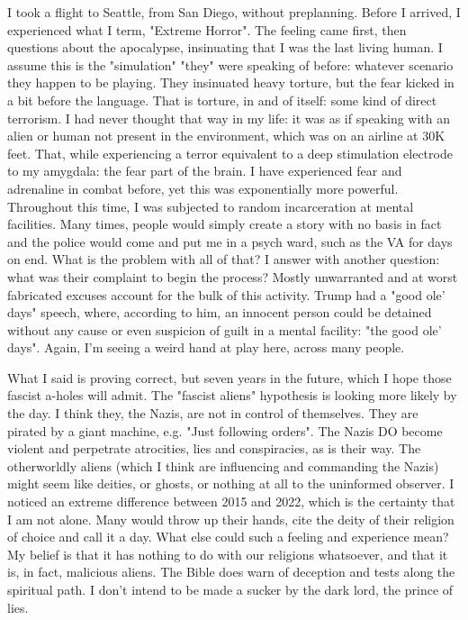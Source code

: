 \documentclass{article}
\begin{document}
\begin{multicols}{2}
I took a flight to Seattle, from San Diego, without preplanning. Before I arrived, I experienced what I term, "Extreme Horror". The feeling came first, then questions about the apocalypse, insinuating that I was the last living human. I assume this is the "simulation" "they" were speaking of before: whatever scenario they happen to be playing. They insinuated heavy torture, but the fear kicked in a bit before the language. That is torture, in and of itself: some kind of direct terrorism. I had never thought that way in my life: it was as if speaking with an alien or human not present in the environment, which was on an airline at 30K feet. That, while experiencing a terror equivalent to a deep stimulation electrode to my amygdala: the fear part of the brain. I have experienced fear and adrenaline in combat before, yet this was exponentially more powerful. Throughout this time, I was subjected to random incarceration at mental facilities. Many times, people would simply create a story with no basis in fact and the police would come and put me in a psych ward, such as the VA for days on end. What is the problem with all of that? I answer with another question: what was their complaint to begin the process? Mostly unwarranted and at worst fabricated excuses account for the bulk of this activity. Trump had a "good ole' days" speech, where, according to him, an innocent person could be detained without any cause or even suspicion of guilt in a mental facility: "the good ole' days". Again, I'm seeing a weird hand at play here, across many people. 

What I said is proving correct, but seven years in the future, which I hope those fascist a-holes will admit. The "fascist aliens" hypothesis is looking more likely by the day. I think they, the Nazis, are not in control of themselves. They are pirated by a giant machine, e.g. "Just following orders". The Nazis DO become violent and perpetrate atrocities, lies and conspiracies, as is their way. The otherworldly aliens (which I think are influencing and commanding the Nazis) might seem like deities, or ghosts, or nothing at all to the uninformed observer. I noticed an extreme difference between 2015 and 2022, which is the certainty that I am not alone. Many would throw up their hands, cite the deity of their religion of choice and call it a day. What else could such a feeling and experience mean? My belief is that it has nothing to do with our religions whatsoever, and that it is, in fact, malicious aliens. The Bible does warn of deception and tests along the spiritual path. I don't intend to be made a sucker by the dark lord, the prince of lies.


\end{multicols}
\end{document}
